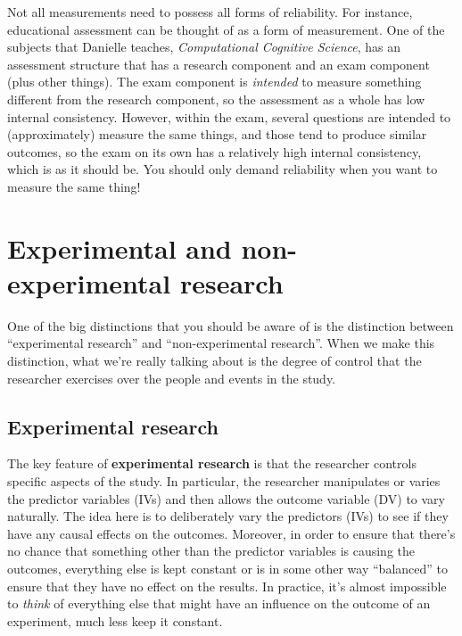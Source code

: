 \documentclass[
  11pt,
]{book}
\theoremstyle{indenteddefinition}
\theoremstyle{indenteddefinition}
\theoremstyle{definition}
\theoremstyle{definition}
\theoremstyle{remark}
\begin{document}
Not all measurements need to possess all forms of reliability. For instance, educational assessment can be thought of as a form of measurement. One of the subjects that Danielle teaches, \emph{Computational Cognitive Science}, has an assessment structure that has a research component and an exam component (plus other things). The exam component is \emph{intended} to measure something different from the research component, so the assessment as a whole has low internal consistency. However, within the exam, several questions are intended to (approximately) measure the same things, and those tend to produce similar outcomes, so the exam on its own has a relatively high internal consistency, which is as it should be. You should only demand reliability when you want to measure the same thing!

\hypertarget{researchdesigns}{%
\section{Experimental and non-experimental research}\label{researchdesigns}}

One of the big distinctions that you should be aware of is the distinction between ``experimental research'' and ``non-experimental research''. When we make this distinction, what we're really talking about is the degree of control that the researcher exercises over the people and events in the study.

\hypertarget{experimental-research}{%
\subsection{Experimental research}\label{experimental-research}}

The key feature of \textbf{experimental research} is that the researcher controls specific aspects of the study. In particular, the researcher manipulates or varies the predictor variables (IVs) and then allows the outcome variable (DV) to vary naturally. The idea here is to deliberately vary the predictors (IVs) to see if they have any causal effects on the outcomes. Moreover, in order to ensure that there's no chance that something other than the predictor variables is causing the outcomes, everything else is kept constant or is in some other way ``balanced'' to ensure that they have no effect on the results. In practice, it's almost impossible to \emph{think} of everything else that might have an influence on the outcome of an experiment, much less keep it constant.
\end{document}
